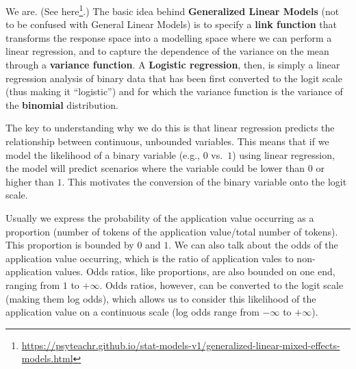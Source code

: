 \documentclass[
  10pt,
  letterpaper]{article}
\DeclareRobustCommand{\href}[2]{#2\footnote{\url{#1}}}
\begin{document}
\begin{tcolorbox}[enhanced jigsaw, colbacktitle=quarto-callout-note-color!10!white, left=2mm, breakable, opacityback=0, toprule=.15mm, titlerule=0mm, bottomtitle=1mm, colframe=quarto-callout-note-color-frame, opacitybacktitle=0.6, coltitle=black, leftrule=.75mm, toptitle=1mm, rightrule=.15mm, title=\textcolor{quarto-callout-note-color}{\faInfo}\hspace{0.5em}{Wait, I thought we were doing logistic regression?}, bottomrule=.15mm, colback=white, arc=.35mm]

We are. (See
\href{https://psyteachr.github.io/stat-models-v1/generalized-linear-mixed-effects-models.html}{here}.)
The basic idea behind \textbf{Generalized Linear Models} (not to be
confused with General Linear Models) is to specify a \textbf{link
function} that transforms the response space into a modelling space
where we can perform a linear regression, and to capture the dependence
of the variance on the mean through a \textbf{variance function}. A
\textbf{Logistic regression}, then, is simply a linear regression
analysis of binary data that has been first converted to the logit scale
(thus making it ``logistic'') and for which the variance function is the
variance of the \textbf{binomial} distribution.

The key to understanding why we do this is that linear regression
predicts the relationship between continuous, unbounded variables. This
means that if we model the likelihood of a binary variable (e.g., \(0\)
vs.~\(1\)) using linear regression, the model will predict scenarios
where the variable could be lower than \(0\) or higher than \(1\). This
motivates the conversion of the binary variable onto the logit scale.

Usually we express the probability of the application value occurring as
a proportion (number of tokens of the application value/total number of
tokens). This proportion is bounded by \(0\) and \(1\). We can also talk
about the odds of the application value occurring, which is the ratio of
application vales to non-application values. Odds ratios, like
proportions, are also bounded on one end, ranging from \(1\) to
\(+\infty\). Odds ratios, however, can be converted to the logit scale
(making them log odds), which allows us to consider this likelihood of
the application value on a continuous scale (log odds range from
\(-\infty\) to \(+\infty\)).

\end{tcolorbox}
\end{document}
